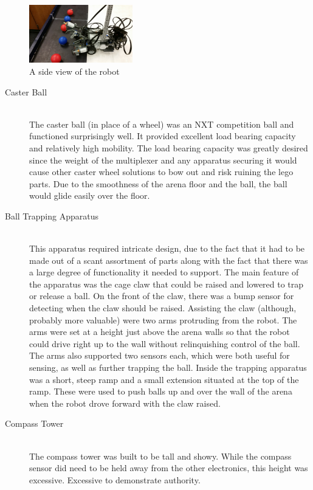 \documentclass{article}
\begin{document}
	\begin{figure}[h]
	\centering
	\includegraphics[width = 0.4\textwidth]{side_view}
	\caption{A side view of the robot}
	\label{fig:side_view}
	\end{figure}

\begin{description}
  \item[Caster Ball] \hfill \\
  The caster ball (in place of a wheel) was an NXT competition ball and functioned surprisingly well. It provided excellent load bearing capacity and relatively high mobility. The load bearing capacity was greatly desired since the weight of the multiplexer and any apparatus securing it would cause other caster wheel solutions to bow out and risk ruining the lego parts. Due to the smoothness of the arena floor and the ball, the ball would glide easily over the floor.

  \item[Ball Trapping Apparatus] \hfill \\
  This apparatus required intricate design, due to the fact that it had to be made out of a scant assortment of parts along with the fact that there was a large degree of functionality it needed to support. The main feature of the apparatus was the cage claw that could be raised and lowered to trap or release a ball. On the front of the claw, there was a bump sensor for detecting when the claw should be raised. Assisting the claw (although, probably more valuable) were two arms protruding from the robot. The arms were set at a height just above the arena walls so that the robot could drive right up to the wall without relinquishing control of the ball. The arms also supported two sensors each, which were both useful for sensing, as well as further trapping the ball. Inside the trapping apparatus was a short, steep ramp and a small extension situated at the top of the ramp. These were used to push balls up and over the wall of the arena when the robot drove forward with the claw raised.

  \item[Compass Tower] \hfill \\
  The compass tower was built to be tall and showy. While the compass sensor did need to be held away from the other electronics, this height was excessive. Excessive to demonstrate authority.
\end{description}
\end{document}
